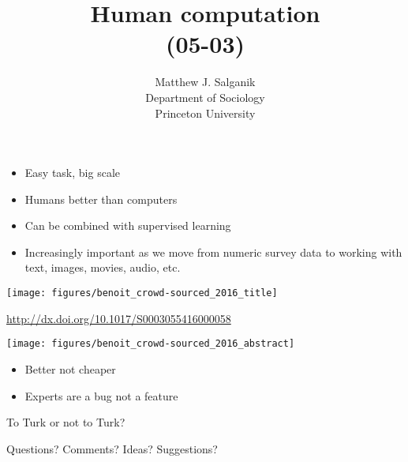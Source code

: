 \documentclass[aspectratio=169]{beamer}
\title[]{Human computation\\(05-03)}
\author[]{Matthew J. Salganik\\Department of Sociology\\Princeton University}
\date[]{Soc 596: Computational Social Science\\Fall 2016
\vfill
\begin{flushright}
\vspace{0.6in}
\texttt{[image: figures/cc.png]}
\end{flushright}
}
\def\vf{\vfill}
\begin{document}
\frame{\titlepage}
\begin{frame}

\begin{itemize}
\item Easy task, big scale
\pause
\item Humans better than computers
\pause
\item Can be combined with supervised learning
\pause
\item Increasingly important as we move from numeric survey data to working with text, images, movies, audio, etc.
\end{itemize}

\end{frame}
\begin{frame}

\begin{center}
\texttt{[image: figures/benoit\_crowd-sourced\_2016\_title]}
\end{center}

\vf
{\tiny \url{http://dx.doi.org/10.1017/S0003055416000058}}

\end{frame}
\begin{frame}

\begin{center}
\texttt{[image: figures/benoit\_crowd-sourced\_2016\_abstract]}
\end{center}

\end{frame}
\begin{frame}

\begin{itemize}
\item Better not cheaper
\pause
\item Experts are a bug not a feature
\end{itemize}

\end{frame}
\begin{frame}

{\Large
\begin{center}
To Turk or not to Turk?
\end{center}
}

\end{frame}
\begin{frame}

{\Large
\begin{center}
Questions?  Comments?  Ideas? Suggestions?
\end{center}
}

\end{frame}
\end{document}
